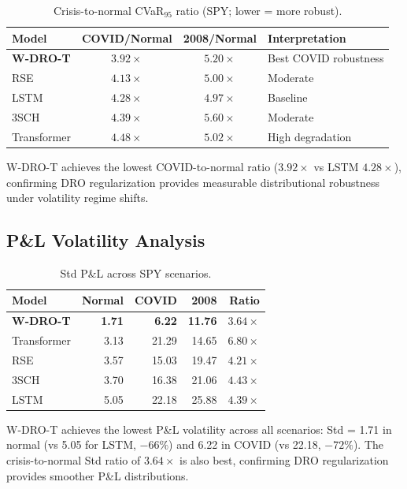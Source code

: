 \begin{table}[H]
\centering\small
\caption{Crisis-to-normal CVaR$_{95}$ ratio (SPY; lower = more robust).}
\label{tab:robustness}
\begin{tabular}{@{}lccl@{}}
\toprule
\textbf{Model} & \textbf{COVID/Normal} & \textbf{2008/Normal} & \textbf{Interpretation} \\\midrule
\textbf{W-DRO-T} & $\mathbf{3.92\times}$ & $5.20\times$ & Best COVID robustness \\
RSE & $4.13\times$ & $5.00\times$ & Moderate \\
LSTM & $4.28\times$ & $4.97\times$ & Baseline \\
3SCH & $4.39\times$ & $5.60\times$ & Moderate \\
Transformer & $4.48\times$ & $5.02\times$ & High degradation \\
\bottomrule
\end{tabular}
\end{table}

W-DRO-T achieves the lowest COVID-to-normal ratio ($3.92\times$ vs LSTM $4.28\times$), confirming DRO regularization provides measurable distributional robustness under volatility regime shifts.

\subsection{P\&L Volatility Analysis}

\begin{table}[H]
\centering\small
\caption{Std P\&L across SPY scenarios.}
\label{tab:std_pnl}
\begin{tabular}{@{}lrrrr@{}}
\toprule
\textbf{Model} & \textbf{Normal} & \textbf{COVID} & \textbf{2008} & \textbf{Ratio} \\\midrule
\textbf{W-DRO-T} & \textbf{1.71} & \textbf{6.22} & \textbf{11.76} & $3.64\times$ \\
Transformer & 3.13 & 21.29 & 14.65 & $6.80\times$ \\
RSE & 3.57 & 15.03 & 19.47 & $4.21\times$ \\
3SCH & 3.70 & 16.38 & 21.06 & $4.43\times$ \\
LSTM & 5.05 & 22.18 & 25.88 & $4.39\times$ \\
\bottomrule
\end{tabular}
\end{table}

W-DRO-T achieves the lowest P\&L volatility across all scenarios: Std = 1.71 in normal (vs 5.05 for LSTM, $-66\%$) and 6.22 in COVID (vs 22.18, $-72\%$). The crisis-to-normal Std ratio of $3.64\times$ is also best, confirming DRO regularization provides smoother P\&L distributions.
